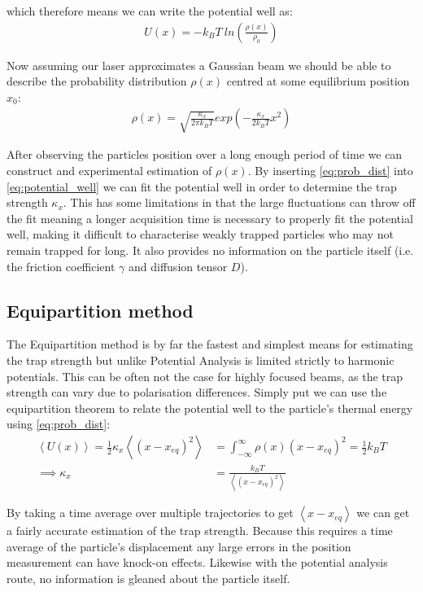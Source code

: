 which therefore means we can write the potential well as:
\begin{align}
	\label{eq:potential_well}
	U(x)=-k_BT\ ln\left(\frac{\rho(x)}{\rho_0} \right)
\end{align}

Now assuming our laser approximates a Gaussian beam we 
should be able to describe the probability distribution 
$\rho(x)$ centred at some equilibrium position $x_0$:
\begin{align}
	\label{eq:prob_dist}
	\rho(x)= \sqrt{\frac{\kappa_x}{2\pi k_BT}} exp\left(-\frac{\kappa_x}{2k_BT}x^2\right)
\end{align}

After observing the particles position over a long enough
period of time we can construct and experimental estimation
of $\rho(x)$. By inserting \eqref{eq:prob_dist} into \eqref{eq:potential_well} we can fit the potential well in 
order to determine the trap strength $\kappa_x$. This has 
some limitations in that the large fluctuations can throw 
off the fit meaning a longer acquisition time is necessary 
to properly fit the potential well, making it difficult to 
characterise weakly trapped particles who may not remain 
trapped for long. It also provides no information on the 
particle itself (i.e. the friction coefficient $\gamma$ and 
diffusion tensor $D$).

\subsection{Equipartition method}
The Equipartition method is by far the fastest and simplest means 
for estimating the trap strength but unlike Potential Analysis is 
limited strictly to harmonic potentials. This can be often not the 
case for highly focused beams, as the trap strength can vary due to 
polarisation differences. Simply put we can use the equipartition 
theorem to relate the potential well to the particle's thermal 
energy using \eqref{eq:prob_dist}:
\begin{align}
	\left<U(x)\right> = \frac{1}{2}\kappa_x\left<(x-x_{eq})^2\right> &= \int_{-\infty}^{\infty}\rho(x)(x-x_{eq})^2 = \frac{1}{2}k_BT \\
	\implies \kappa_x &= \frac{k_BT}{\left<(x-x_{eq})^2\right>} 
\end{align}

By taking a time average over multiple trajectories to get 
$\left<x-x_{eq}\right>$ we can get a fairly accurate estimation 
of the trap strength. Because this requires a time average of 
the particle's displacement any large errors in the position 
measurement can have knock-on effects. Likewise with the potential 
analysis route, no information is gleaned about the particle itself.

